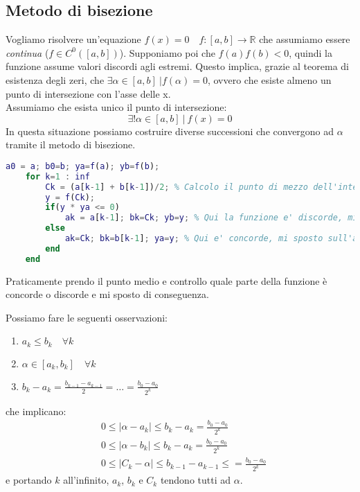 \subsection{Metodo di bisezione}
Vogliamo risolvere un'equazione $f(x)=0 \quad f:[a,b]\to \mathbb{R}$ che assumiamo essere \textit{continua} ($f \in C^0([a,b])$). Supponiamo poi che $f(a)f(b) < 0$, quindi la funzione assume valori discordi agli estremi. Questo implica, grazie al teorema di esistenza degli zeri, che $\exists \alpha \in [a,b] \:\vert f(\alpha)=0$, ovvero che esiste almeno un punto di intersezione con l'asse delle x.\\
Assumiamo che esista unico il punto di intersezione:
\begin{equation*}
	\exists ! \alpha \in [a,b] \:\vert\: f(x)=0
\end{equation*}
In questa situazione possiamo costruire diverse successioni che convergono ad $\alpha$ tramite il metodo di bisezione.
\begin{lstlisting}[language=MatLAB]
	a0 = a; b0=b; ya=f(a); yb=f(b);
	for k=1 : inf
		Ck = (a[k-1] + b[k-1])/2; % Calcolo il punto di mezzo dell'intervallo
		y = f(Ck);
		if(y * ya <= 0)
			ak = a[k-1]; bk=Ck; yb=y; % Qui la funzione e' discorde, mi sposto su questo intervallo
		else
			ak=Ck; bk=b[k-1]; ya=y; % Qui e' concorde, mi sposto sull'altro intervallo
		end
	end
\end{lstlisting}
Praticamente prendo il punto medio e controllo quale parte della funzione è concorde o discorde e mi sposto di conseguenza.
\begin{observation}
	Possiamo fare le seguenti osservazioni:
	\begin{enumerate}
		\item $a_k \leq b_k \quad \forall k$
		\item $\alpha \in [a_k, b_k] \quad \forall k$
		\item $b_k - a_k = \frac{b_{k-1}-a_{k-1}}{2} = \ldots = \frac{b_0 - a_0}{2^k}$
	\end{enumerate}
	che implicano:
	\begin{align*}
		& 0 \leq \lvert \alpha - a_k \rvert \leq b_k - a_k = \frac{b_0 - a_0}{2^k}\\
		& 0 \leq \lvert \alpha - b_k \rvert \leq b_k - a_k = \frac{b_0 - a_0}{2^k}\\
		& 0 \leq \lvert C_k  - \alpha \rvert \leq b_{k-1} - a_{k-1}\leq= \frac{b_0 - a_0}{2^k}
	\end{align*}
	e portando $k$ all'infinito, $a_k$, $b_k$ e $C_k$ tendono tutti ad $\alpha$.
\end{observation}

